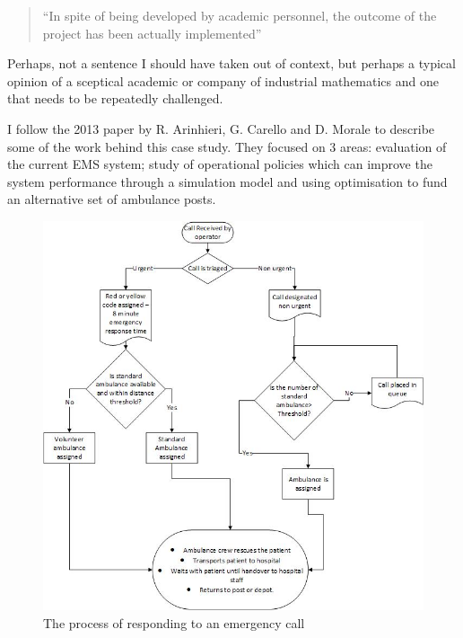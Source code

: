 \documentclass[11pt]{article} %
\begin{document}
	\begin{quote}
		``In spite of being developed by academic personnel, the outcome of the project has been actually implemented''
	\end{quote}

	Perhaps, not a sentence I should have taken out of context, but perhaps a typical  opinion of a sceptical academic or company of industrial mathematics and one that needs to be repeatedly challenged.
	

	I follow the 2013 paper by R. Arinhieri, G. Carello and D. Morale \cite{Carello2013}  to describe some of the work behind this case study.	They focused on 3 areas: evaluation of the current EMS system; study of operational policies which can improve the system performance through a simulation model and using optimisation to fund an alternative set of ambulance posts. 
	\begin{figure}
		\centering
		\includegraphics[width=\linewidth]{Report_images/MilanEMS}
		\caption{The process of responding to an emergency call}
		\label{fig:milanems}
	\end{figure}
\end{document}
